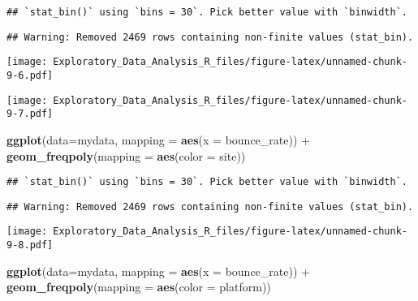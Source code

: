 \documentclass[]{article}
\newenvironment{Shaded}{\begin{snugshade}}{\end{snugshade}}
\newcommand{\KeywordTok}[1]{\textcolor[rgb]{0.13,0.29,0.53}{\textbf{{#1}}}}
\newcommand{\DataTypeTok}[1]{\textcolor[rgb]{0.13,0.29,0.53}{{#1}}}
\newcommand{\StringTok}[1]{\textcolor[rgb]{0.31,0.60,0.02}{{#1}}}
\newcommand{\OtherTok}[1]{\textcolor[rgb]{0.56,0.35,0.01}{{#1}}}
\newcommand{\NormalTok}[1]{{#1}}
\begin{document}
\begin{verbatim}
## `stat_bin()` using `bins = 30`. Pick better value with `binwidth`.
\end{verbatim}

\begin{verbatim}
## Warning: Removed 2469 rows containing non-finite values (stat_bin).
\end{verbatim}

\texttt{[image: Exploratory\_Data\_Analysis\_R\_files/figure-latex/unnamed-chunk-9-6.pdf]}

\begin{Shaded}
\end{Shaded}

\texttt{[image: Exploratory\_Data\_Analysis\_R\_files/figure-latex/unnamed-chunk-9-7.pdf]}

\begin{Shaded}
\begin{Highlighting}[]
\KeywordTok{ggplot}\NormalTok{(}\DataTypeTok{data=}\NormalTok{mydata, }\DataTypeTok{mapping =} \KeywordTok{aes}\NormalTok{(}\DataTypeTok{x =} \NormalTok{bounce_rate)) +}
\StringTok{  }\KeywordTok{geom_freqpoly}\NormalTok{(}\DataTypeTok{mapping =} \KeywordTok{aes}\NormalTok{(}\DataTypeTok{color =} \NormalTok{site))}
\end{Highlighting}
\end{Shaded}

\begin{verbatim}
## `stat_bin()` using `bins = 30`. Pick better value with `binwidth`.
\end{verbatim}

\begin{verbatim}
## Warning: Removed 2469 rows containing non-finite values (stat_bin).
\end{verbatim}

\texttt{[image: Exploratory\_Data\_Analysis\_R\_files/figure-latex/unnamed-chunk-9-8.pdf]}

\begin{Shaded}
\begin{Highlighting}[]
\KeywordTok{ggplot}\NormalTok{(}\DataTypeTok{data=}\NormalTok{mydata, }\DataTypeTok{mapping =} \KeywordTok{aes}\NormalTok{(}\DataTypeTok{x =} \NormalTok{bounce_rate)) +}
\StringTok{  }\KeywordTok{geom_freqpoly}\NormalTok{(}\DataTypeTok{mapping =} \KeywordTok{aes}\NormalTok{(}\DataTypeTok{color =} \NormalTok{platform))}
\end{Highlighting}
\end{Shaded}
\end{document}
